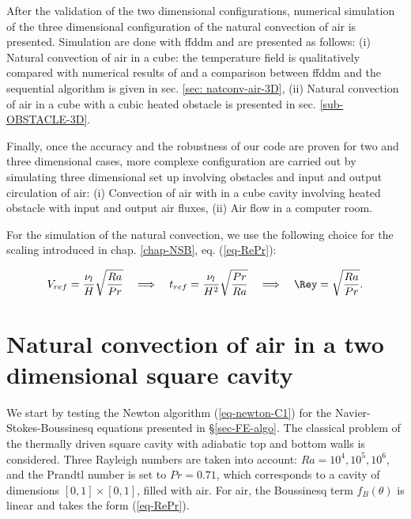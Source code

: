 After the validation of the two dimensional configurations, numerical simulation of the three dimensional configuration of the natural convection of air is presented. 
Simulation are done with ffddm and are presented as follows: \newline{}
(i) Natural convection of air in a cube: the temperature field is qualitatively compared with numerical results of \cite{Wakashima-2004} and a comparison between ffddm and the sequential algorithm is given in 
sec. \ref{sec: natconv-air-3D}, \newline{}
(ii) Natural convection of air in a cube with a cubic heated obstacle is presented in sec. \ref{sub-OBSTACLE-3D}.

Finally, once the accuracy and the robustness of our code are proven for two and three dimensional cases, more complexe configuration are carried out by simulating three dimensional set up involving obstacles and input and output circulation of air:\newline{}
(i) Convection of air with in a cube cavity involving heated obstacle with input and output air fluxes, \newline{}
(ii) Air flow in a computer room.

For the simulation of the natural convection, we use the following choice for the scaling introduced in chap. \ref{chap-NSB}, eq. (\ref{eq-RePr}):

\begin{equation}
   V_{ref} = \frac{\nu_l}{H} \sqrt{\frac{Ra}{Pr}} 
   \quad \Longrightarrow \quad t_{ref} = \frac{\nu_l}{H^2} \sqrt{\frac{Pr}{Ra}} 
   \quad \Longrightarrow \quad \Rey = \sqrt{\frac{Ra}{Pr}}.
\end{equation} 


\section{Natural convection of air in a two dimensional square cavity}\label{sec: natconv-air-2D}
We start by testing the Newton algorithm (\ref{eq-newton-C1}) for the Navier-Stokes-Boussinesq  equations presented in \S \ref{sec-FE-algo}.
The classical problem of the thermally driven square cavity with adiabatic top and bottom walls is considered.
Three Rayleigh numbers are taken into account: $Ra = 10^4, 10^5, 10^6$, and the Prandtl number is set to $Pr = 0.71$, which corresponds to a cavity of dimensions $[ 0 , 1] \times [ 0 , 1]$, filled with air.
For air, the Boussinesq term $f_B(\theta)$ is linear and takes the form (\ref{eq-RePr}).

